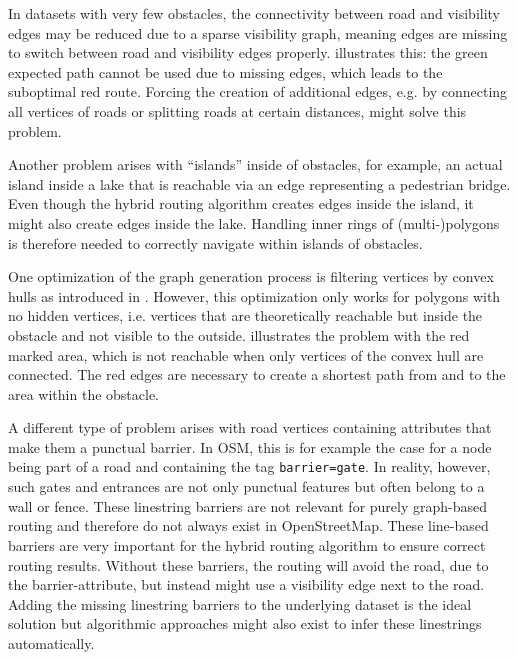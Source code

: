 		In datasets with very few obstacles, the connectivity between road and visibility edges may be reduced due to a sparse visibility graph, meaning edges are missing to switch between road and visibility edges properly.
		 illustrates this:
		the green expected path cannot be used due to missing edges, which leads to the suboptimal red route.
		Forcing the creation of additional edges, e.g. by connecting all vertices of roads or splitting roads at certain distances, might solve this problem.
		
		Another problem arises with \enquote{islands} inside of obstacles, for example, an actual island inside a lake that is reachable via an edge representing a pedestrian bridge.
		Even though the hybrid routing algorithm creates edges inside the island, it might also create edges inside the lake.
		Handling inner rings of (multi-)polygons is therefore needed to correctly navigate within islands of obstacles.
		
		One optimization of the graph generation process is filtering vertices by convex hulls as introduced in .
		However, this optimization only works for polygons with no hidden vertices, i.e. vertices that are theoretically reachable but inside the obstacle and not visible to the outside.
		 illustrates the problem with the red marked area, which is not reachable when only vertices of the convex hull are connected.
		The red edges are necessary to create a shortest path from and to the area within the obstacle.
		
		A different type of problem arises with road vertices containing attributes that make them a punctual barrier.
		In OSM, this is for example the case for a node being part of a road and containing the tag \texttt{barrier=gate}.
		In reality, however, such gates and entrances are not only punctual features but often belong to a wall or fence.
		These linestring barriers are not relevant for purely graph-based routing and therefore do not always exist in OpenStreetMap.
		These line-based barriers are very important for the hybrid routing algorithm to ensure correct routing results.
		Without these barriers, the routing will avoid the road, due to the barrier-attribute, but instead might use a visibility edge next to the road.
		Adding the missing linestring barriers to the underlying dataset is the ideal solution but algorithmic approaches might also exist to infer these linestrings automatically.
		
